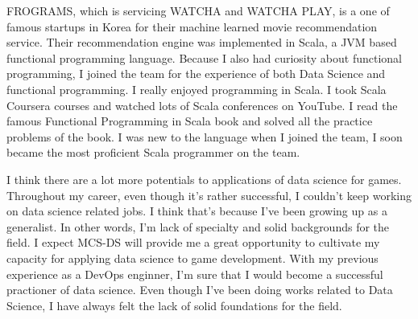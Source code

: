 \documentclass[11pt]{article}
\begin{document}
FROGRAMS, which is servicing WATCHA and WATCHA PLAY, is a one of famous startups in Korea for their machine learned movie recommendation service.
Their recommendation engine was implemented in Scala, a JVM based functional programming language.
Because I also had curiosity about functional programming, I joined the team for the experience of both Data Science and functional programming.
I really enjoyed programming in Scala.
I took Scala Coursera courses and watched lots of Scala conferences on YouTube.
I read the famous Functional Programming in Scala book and solved all the practice problems of the book.
I was new to the language when I joined the team, I soon became the most proficient Scala programmer on the team.

I think there are a lot more potentials to applications of data science for games.
Throughout my career, even though it's rather successful, I couldn't keep working on data science related jobs.
I think that's because I've been growing up as a generalist. In other words, I'm lack of specialty and solid backgrounds for the field.
I expect MCS-DS will provide me a great opportunity to cultivate my capacity for applying data science to game development.
With my previous experience as a DevOps enginner, I'm sure that I would become a successful practioner of data science.
Even though I've been doing works related to Data Science, I have always felt the lack of solid foundations for the field.
\end{document}
